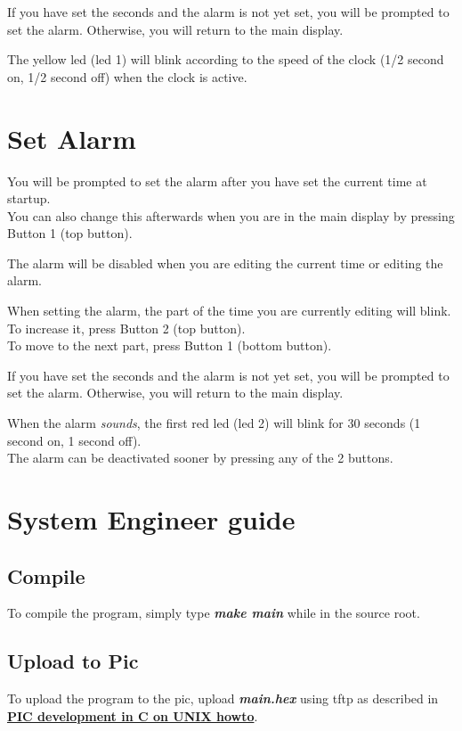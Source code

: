 \documentclass[11pt,a4paper]{scrartcl}
\begin{document}
If you have set the seconds and the alarm is not yet set, you will be prompted to set the alarm. Otherwise, you will return to the main display.

The yellow led (led 1) will blink according to the speed of the clock (1/2 second on, 1/2 second off) when the clock is active.

\section{Set Alarm}
You will be prompted to set the alarm after you have set the current time at startup.\\
You can also change this afterwards when you are in the main display by pressing Button 1 (top button).

The alarm will be disabled when you are editing the current time or editing the alarm.

When setting the alarm, the part of the time you are currently editing will blink.\\
To increase it, press Button 2 (top button).\\
To move to the next part, press Button 1 (bottom button).

If you have set the seconds and the alarm is not yet set, you will be prompted to set the alarm. Otherwise, you will return to the main display.

When the alarm \textit{sounds}, the first red led (led 2) will blink for 30 seconds (1 second on, 1 second off).\\
The alarm can be deactivated sooner by pressing any of the 2 buttons.

\section{System Engineer guide}
\subsection{Compile}
To compile the program, simply type \textbf{\textit{make main}} while in the source root.

\subsection{Upload to Pic}
To upload the program to the pic, upload \textbf{\textit{main.hex}} using tftp as described in \href{http://www.foditic.org/SORTES\_14/missions/picUnixE.php}{\textbf{PIC development in C on UNIX howto}}.
\end{document}
